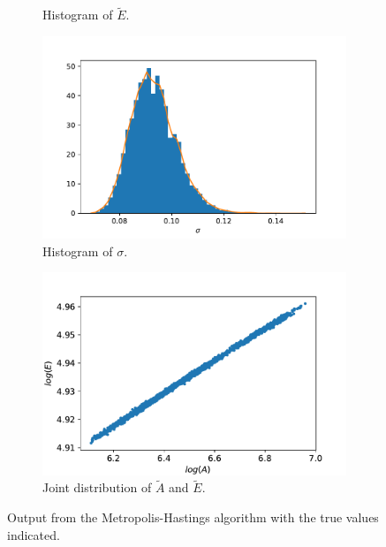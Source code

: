 \begin{figure}[h!]
\begin{subfigure}{0.5\textwidth}
\caption{Histogram of $\tilde{E}$.}
\label{HistE}
\end{subfigure}
\newline
\begin{subfigure}{0.5\textwidth}
\centering
\includegraphics[width=\linewidth]{figures/bayesian/hist_sigma.pdf}
\caption{Histogram of $\sigma$.}
\label{Histsigma}
\end{subfigure}%
\begin{subfigure}{0.5\textwidth}
\centering
\includegraphics[width=\linewidth]{figures/bayesian/joint_distribution.pdf}
\caption{Joint distribution of $\tilde{A}$ and $\tilde{E}$.}
\label{AvsE}
\end{subfigure}
\caption{Output from the Metropolis-Hastings algorithm with the true values indicated.}
\label{fig:MH1}
\end{figure}

